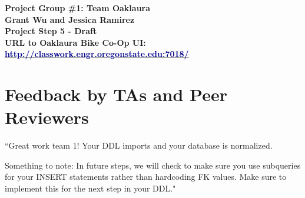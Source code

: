 \documentclass{article}
\begin{document}
\begin{center}
\large\textcolor{primarycolor}{\textbf{Project Group \#1: Team Oaklaura}}\\[0.3cm]
\large\textbf{Grant Wu and Jessica Ramirez}\\[0.3cm]
\huge\textbf{Project Step 5 - Draft}\\[0.5cm]

\large\textbf{URL to Oaklaura Bike Co-Op UI:}\\[0.5cm]
\large\href{http://classwork.engr.oregonstate.edu:7018/}{\textcolor{darkblue}{\textbf{http://classwork.engr.oregonstate.edu:7018/}}}\\[1.25cm]
\end{center}
\section{Feedback by TAs and Peer Reviewers}
\begin{tcolorbox}[colback=secondarycolor, colframe=primarycolor, title=\textbf{Step 4: TA Review - Madelyn Lazar}]
``Great work team 1! Your DDL imports and your database is normalized. 

\vspace{0.2cm}
Something to note: In future steps, we will check to make sure you use subqueries for your INSERT statements rather than hardcoding FK values. Make sure to implement this for the next step in your DDL."
\end{tcolorbox}
\end{document}
